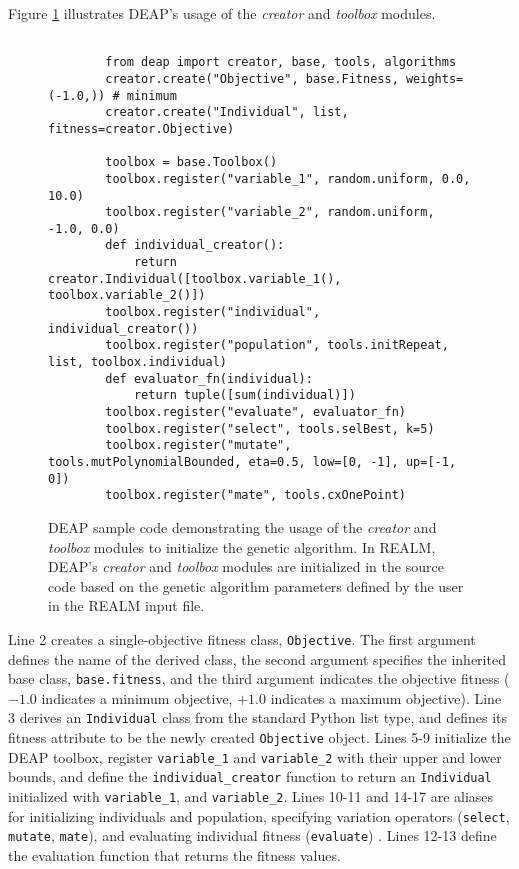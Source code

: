 Figure \ref{fig:deap-code} illustrates \gls{DEAP}'s usage of the \textit{creator} and
\textit{toolbox} modules. 
\begin{figure}[]
    \begin{verbatim}
        
        from deap import creator, base, tools, algorithms
        creator.create("Objective", base.Fitness, weights=(-1.0,)) # minimum
        creator.create("Individual", list, fitness=creator.Objective)

        toolbox = base.Toolbox()
        toolbox.register("variable_1", random.uniform, 0.0, 10.0)
        toolbox.register("variable_2", random.uniform, -1.0, 0.0)
        def individual_creator():
            return creator.Individual([toolbox.variable_1(), toolbox.variable_2()])
        toolbox.register("individual", individual_creator())
        toolbox.register("population", tools.initRepeat, list, toolbox.individual)
        def evaluator_fn(individual):
            return tuple([sum(individual)])
        toolbox.register("evaluate", evaluator_fn)
        toolbox.register("select", tools.selBest, k=5)
        toolbox.register("mutate", tools.mutPolynomialBounded, eta=0.5, low=[0, -1], up=[-1, 0])
        toolbox.register("mate", tools.cxOnePoint)
    \end{verbatim}
    \caption{DEAP sample code demonstrating the usage of the \textit{creator} and
    \textit{toolbox} modules to initialize the genetic algorithm. In \gls{REALM}, \gls{DEAP}'s 
    \textit{creator} and \textit{toolbox} modules are initialized in the source 
    code based on the genetic algorithm parameters defined by the user in the 
    \gls{REALM} input file. }
    \label{fig:deap-code}
\end{figure}
Line 2 creates a single-objective fitness class, \texttt{Objective}. 
The first argument defines the name of the derived class, the second argument 
specifies the inherited base class, \texttt{base.fitness}, and the third 
argument indicates the objective fitness ($-1.0$ indicates a minimum objective, 
$+1.0$ indicates a maximum objective). 
Line 3 derives an \texttt{Individual} class from the standard Python list type,
and defines its fitness attribute to be the newly created \texttt{Objective} object. 
Lines 5-9 initialize the \gls{DEAP} toolbox, register 
\texttt{variable\_1} and \texttt{variable\_2} with their upper and lower bounds, 
and define the \texttt{individual\_creator} function to return an 
\texttt{Individual} initialized with \texttt{variable\_1}, and \texttt{variable\_2}. 
Lines 10-11 and 14-17 are aliases for initializing individuals and population, 
specifying variation operators (\texttt{select}, \texttt{mutate}, \texttt{mate}), 
and evaluating individual fitness (\texttt{evaluate}) \cite{fortin_deap_2012}. 
Lines 12-13 define the evaluation function that returns the fitness values. 


